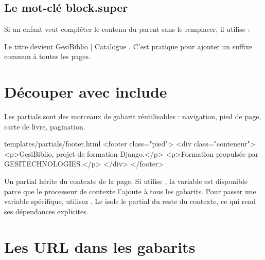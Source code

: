 \subsection{Le mot-clé block.super}

Si un enfant veut compléter le contenu du parent sans le remplacer, il utilise
 :


Le titre devient \og GesiBiblio | Catalogue \fg. C'est pratique pour ajouter un
suffixe commun à toutes les pages.

\section{Découper avec include}

Les partials sont des morceaux de gabarit réutilisables : navigation, pied de page,
carte de livre, pagination.


\begin{codebox}[html]{templates/partials/footer.html}
<footer class="pied">
  <div class="conteneur">
    <p>GesiBiblio, projet de formation Django.</p>
    <p>Formation propulsée par GESITECHNOLOGIES.</p>
  </div>
</footer>
\end{codebox}

\begin{note}
Un partial hérite du contexte de la page. Si  utilise
, la variable est disponible parce que le processeur de contexte
 l'ajoute à tous les gabarits. Pour passer une variable spécifique,
utilisez . Le
 isole le partial du reste du contexte, ce qui rend ses dépendances
explicites.
\end{note}

\section{Les URL dans les gabarits}

